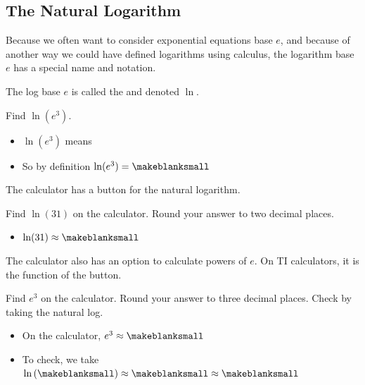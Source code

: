 \subsection{The Natural Logarithm} 
Because we often want to consider exponential equations base $e$, and because of another way we could have defined logarithms using calculus, the logarithm base $e$ has a special name and notation.
\begin{definition}
The log base $e$ is called the  and denoted $\ln$.
\end{definition}
\begin{Example}
Find $\ln(e^3)$.
\begin{itemize}
\item $\ln(e^3)$ means \makeblank[1in]
\item So by definition $\ln(e^3)=\makeblanksmall$
\end{itemize}
\end{Example}
The calculator has a button for the natural logarithm.
\begin{Example}
Find $\ln(31)$ on the calculator. Round your answer to two decimal places.
\begin{itemize}
\item $\ln(31)\approx \makeblanksmall$
\end{itemize}
\end{Example}
The calculator also has an option to calculate powers of $e$. On TI calculators, it is the \makeblanksmall function of the \makeblanksmall button.
\begin{Example}
Find $e^3$ on the calculator. Round your answer to three decimal places. Check by taking the natural log.
\begin{itemize}
\item On the calculator, $e^3\approx\makeblanksmall$
\item To check, we take $\ln\left(\makeblanksmall\right)\approx\makeblanksmall\approx\makeblanksmall$
\end{itemize}
\end{Example}